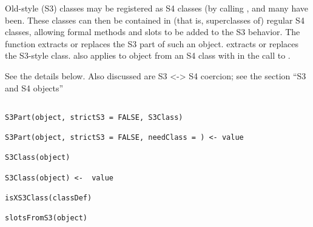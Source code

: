 %
\begin{Description}\relax
Old-style (S3) classes may be registered as S4 classes (by calling
, and many have been.  These classes can
then be contained in (that is, superclasses of) regular S4 classes, allowing formal methods
and slots to be added to the S3 behavior.  The function
 extracts or replaces 
the S3 part of such an object.
 extracts or
replaces the S3-style class.   also applies to object
from an S4 class with  in the call to .

See the details below.
Also discussed are S3 <-> S4 coercion; see the section
``S3 and S4 objects''
\end{Description}
%
\begin{Usage}
\begin{verbatim}

S3Part(object, strictS3 = FALSE, S3Class)

S3Part(object, strictS3 = FALSE, needClass = ) <- value

S3Class(object)

S3Class(object) <-  value

isXS3Class(classDef)

slotsFromS3(object)

\end{verbatim}
\end{Usage}
%
